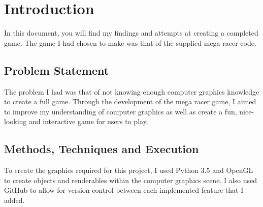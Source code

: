 \documentclass[11pt, oneside, a4paper]{article}
\begin{document}


\pagestyle{fancy}
\fancyhf{}


\newpage
\tableofcontents

\listoffigures

\newpage


\section{Introduction}
In this document, you will find my findings and attempts at creating a completed game. The game I had chosen to make was that of the supplied mega racer code.

\subsection{Problem Statement}
The problem I had was that of not knowing enough computer graphics knowledge to create a full game. Through the development of the mega racer game, I aimed to improve my understanding of computer graphics as well as create a fun, nice-looking and interactive game for users to play.

\subsection{Methods, Techniques and Execution}
To create the graphics required for this project, I used Python 3.5 and OpenGL to create objects and renderables within the computer graphics scene. I also used GitHub to allow for version control between each implemented feature that I added.
\end{document}
